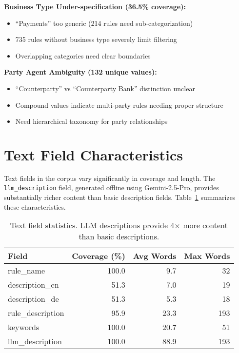 \textbf{Business Type Under-specification (36.5\% coverage):}
\begin{itemize}[leftmargin=*,itemsep=2pt,topsep=2pt]
 \item ``Payments'' too generic (214 rules need sub-categorization)
 \item 735 rules without business type severely limit filtering
 \item Overlapping categories need clear boundaries
\end{itemize}

\textbf{Party Agent Ambiguity (132 unique values):}
\begin{itemize}[leftmargin=*,itemsep=2pt,topsep=2pt]
 \item ``Counterparty'' vs ``Counterparty Bank'' distinction unclear
 \item Compound values indicate multi-party rules needing proper structure
 \item Need hierarchical taxonomy for party relationships
\end{itemize}

\section{Text Field Characteristics}

Text fields in the corpus vary significantly in coverage and length. The \texttt{llm\_description} field, generated offline using Gemini-2.5-Pro, provides substantially richer content than basic description fields. Table~\ref{tab:text-stats} summarizes these characteristics.

\begin{table}[h]
\centering
\begin{tabular}{lrrr}
\toprule
\textbf{Field} & \textbf{Coverage (\%)} & \textbf{Avg Words} & \textbf{Max Words} \\
\midrule
rule\_name & 100.0 & 9.7 & 32 \\
description\_en & 51.3 & 7.0 & 19 \\
description\_de & 51.3 & 5.3 & 18 \\
rule\_description & 95.9 & 23.3 & 193 \\
keywords & 100.0 & 20.7 & 51 \\
llm\_description & 100.0 & 88.9 & 193 \\
\bottomrule
\end{tabular}
\caption{Text field statistics. LLM descriptions provide 4× more content than basic descriptions.}
\label{tab:text-stats}
\end{table}

